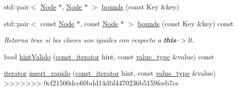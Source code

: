 \begin{Indent}
\begin{DoxyCompactItemize}
std\+::pair$<$ \hyperlink{structaed2_1_1map_1_1Node}{Node} $\ast$, \hyperlink{structaed2_1_1map_1_1Node}{Node} $\ast$ $>$ \hyperlink{classaed2_1_1map_aa079b9390f988f97be26fd51ed44a2c9_aa079b9390f988f97be26fd51ed44a2c9}{bounds} (const Key \&key)
\item 
std\+::pair$<$ const \hyperlink{structaed2_1_1map_1_1Node}{Node} $\ast$, const \hyperlink{structaed2_1_1map_1_1Node}{Node} $\ast$ $>$ \hyperlink{classaed2_1_1map_a76b9671ef411cd38f918cbeadb998199_a76b9671ef411cd38f918cbeadb998199}{bounds} (const Key \&key) const
\begin{DoxyCompactList}\small\item\em Retorna true si las claves son iguales con respecto a {\bfseries this}-\/$>$lt. \end{DoxyCompactList}\item 
bool \hyperlink{classaed2_1_1map_a0039f50bdf2b4e5836a1ad437ecb2202_a0039f50bdf2b4e5836a1ad437ecb2202}{hint\+Valido} (\hyperlink{classaed2_1_1map_1_1const__iterator}{const\+\_\+iterator} hint, const \hyperlink{classaed2_1_1map_a719db98e0ff9a837610f76be33264680_a719db98e0ff9a837610f76be33264680}{value\+\_\+type} \&value) const
\item 
\hyperlink{classaed2_1_1map_1_1iterator}{iterator} \hyperlink{classaed2_1_1map_a4b4f1e65ee9aeccee4046d53fd5fd8a4_a4b4f1e65ee9aeccee4046d53fd5fd8a4}{insert\+\_\+rapido} (\hyperlink{classaed2_1_1map_1_1const__iterator}{const\+\_\+iterator} hint, const \hyperlink{classaed2_1_1map_a719db98e0ff9a837610f76be33264680_a719db98e0ff9a837610f76be33264680}{value\+\_\+type} \&value)
>>>>>>> 0cf21500dcc60bdd14dbf4470236b5159feeb7ce
\end{DoxyCompactItemize}
\end{Indent}
